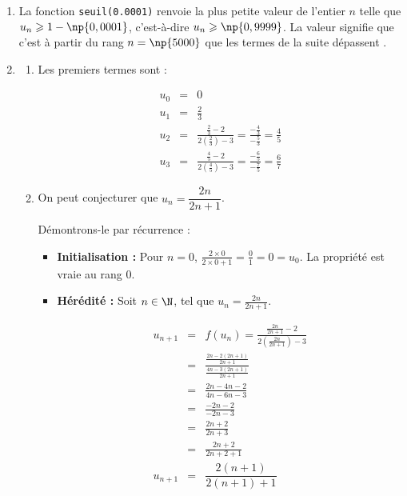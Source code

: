 \begin{enumerate}
\[\begin{array}{rcl}
\dfrac{x - 2}{2x - 3} = x &\iff& x - 2 = x(2x - 3) \\
&\iff& x - 2 = 2x^2 - 3x \\
&\iff& 2x^2 - 4x + 2 = 0 \\
&\iff& 2(x - 1)^2 = 0 \\
&\iff& (x - 1)^2 = 0\\
&\iff& (x - 1) = 0\\
&\iff& x  = 1\\
\end{array}\]

On en déduit que $\ell = 1$ et donc que la suite $(u_n)$ converge vers 1.
\item La fonction \texttt{seuil(0.0001)} renvoie la plus petite valeur de l'entier $n$ telle que $u_n \geqslant 1 - \np{0,0001}$, c'est-à-dire $u_n \geqslant \np{0,9999}$. La valeur  signifie que c'est à partir du rang $n = \np{5000}$ que les termes de la suite dépassent .

\item
\begin{enumerate}
\item Les premiers termes sont :

\[\begin{array}{rcl}
u_0 &=& 0 \\
u_1 &=& \frac{2}{3} \\
u_2 &=& \frac{\frac{2}{3} - 2}{2\left(\frac{2}{3}\right) - 3} = \frac{-\frac{4}{3}}{-\frac{5}{3}} = \frac{4}{5} \\
u_3 &=& \frac{\frac{4}{5} - 2}{2\left(\frac{4}{5}\right) - 3} = \frac{-\frac{6}{5}}{-\frac{7}{5}} = \frac{6}{7}
\end{array}\]

\item On peut conjecturer que $u_n = \dfrac{2n}{2n + 1}$.

Démontrons-le par récurrence :

\begin{itemize}
\item \textbf{Initialisation :} Pour $n = 0$, $\frac{2 \times 0}{2 \times0 + 1} = \frac01 = 0 = u_0$. La propriété est vraie au rang 0.
\item \textbf{Hérédité :} Soit $n \in \N$, tel que $u_n = \frac{2n}{2n + 1}$.

\[\begin{array}{rcl}
u_{n+1} &=& f(u_n) = \frac{\frac{2n}{2n+1} - 2}{2\left(\frac{2n}{2n+1}\right) - 3} \\
&=& \frac{\frac{2n - 2(2n+1)}{2n+1}}{\frac{4n - 3(2n+1)}{2n+1}} \\
&=& \frac{2n - 4n - 2}{4n - 6n - 3} \\
&=& \frac{-2n- 2}{-2n - 3} \\&=& \frac{2n+2}{2n+3}\\
&=& \frac{2n+2}{2n+2 + 1}\\
u_{n+1} &=&\dfrac{2(n+1)}{2(n+1) + 1}\\
\end{array}\]


\end{itemize}
\end{enumerate}
\end{enumerate}
